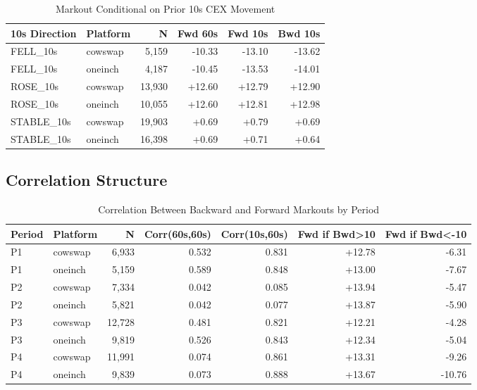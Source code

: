 \documentclass[11pt,a4paper]{article}
\begin{document}
\begin{table}[H]
\centering
\caption{Markout Conditional on Prior 10s CEX Movement}
\begin{tabular}{llrrrr}
\toprule
\textbf{10s Direction} & \textbf{Platform} & \textbf{N} & \textbf{Fwd 60s} & \textbf{Fwd 10s} & \textbf{Bwd 10s} \\
\midrule
FELL\_10s & cowswap & 5,159 & -10.33 & -13.10 & -13.62 \\
FELL\_10s & oneinch & 4,187 & -10.45 & -13.53 & -14.01 \\
ROSE\_10s & cowswap & 13,930 & +12.60 & +12.79 & +12.90 \\
ROSE\_10s & oneinch & 10,055 & +12.60 & +12.81 & +12.98 \\
STABLE\_10s & cowswap & 19,903 & +0.69 & +0.79 & +0.69 \\
STABLE\_10s & oneinch & 16,398 & +0.69 & +0.71 & +0.64 \\
\bottomrule
\end{tabular}
\end{table}

\subsection{Correlation Structure}

\begin{table}[H]
\centering
\caption{Correlation Between Backward and Forward Markouts by Period}
\begin{tabular}{llrrrrr}
\toprule
\textbf{Period} & \textbf{Platform} & \textbf{N} & \textbf{Corr(60s,60s)} & \textbf{Corr(10s,60s)} & \textbf{Fwd if Bwd>10} & \textbf{Fwd if Bwd<-10} \\
\midrule
P1 & cowswap & 6,933 & 0.532 & 0.831 & +12.78 & -6.31 \\
P1 & oneinch & 5,159 & 0.589 & 0.848 & +13.00 & -7.67 \\
P2 & cowswap & 7,334 & 0.042 & 0.085 & +13.94 & -5.47 \\
P2 & oneinch & 5,821 & 0.042 & 0.077 & +13.87 & -5.90 \\
P3 & cowswap & 12,728 & 0.481 & 0.821 & +12.21 & -4.28 \\
P3 & oneinch & 9,819 & 0.526 & 0.843 & +12.34 & -5.04 \\
P4 & cowswap & 11,991 & 0.074 & 0.861 & +13.31 & -9.26 \\
P4 & oneinch & 9,839 & 0.073 & 0.888 & +13.67 & -10.76 \\
\bottomrule
\end{tabular}
\end{table}
\end{document}
